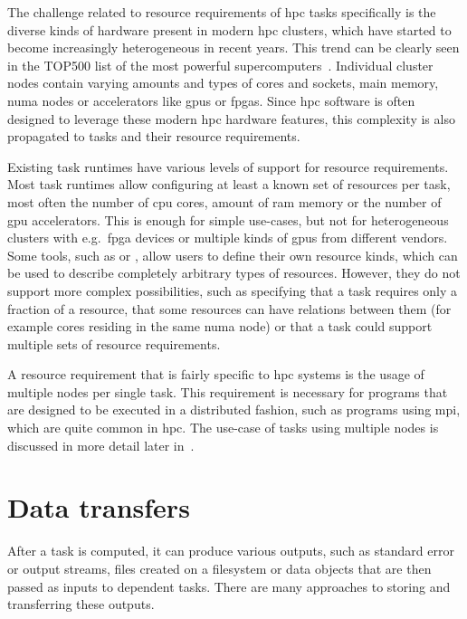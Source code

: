 The challenge related to resource requirements of \gls{hpc} tasks specifically is the
diverse kinds of hardware present in modern \gls{hpc} clusters, which have started to
become increasingly heterogeneous in recent years. This trend can be clearly seen in the TOP500
list of the most powerful supercomputers~\cite{top500analysis}. Individual cluster nodes contain
varying amounts and types of cores and sockets, main memory, \gls{numa} nodes or
accelerators like \glspl{gpu} or \glspl{fpga}. Since \gls{hpc}
software is often designed to leverage these modern \gls{hpc} hardware features, this
complexity is also propagated to tasks and their resource requirements.

Existing task runtimes have various levels of support for resource requirements. Most task runtimes
allow configuring at least a known set of resources per task, most often the number of
\gls{cpu} cores, amount of \gls{ram} memory or the number of
\gls{gpu} accelerators. This is enough for simple use-cases, but not for
heterogeneous clusters with e.g.\ \gls{fpga} devices or multiple kinds of
\glspl{gpu} from different vendors. Some tools, such as \dask{} or
\snakemake{}, allow users to define their own resource kinds, which can be used to
describe completely arbitrary types of resources. However, they do not support more complex
possibilities, such as specifying that a task requires only a fraction of a resource, that some
resources can have relations between them (for example cores residing in the same
\gls{numa} node) or that a task could support multiple sets of resource requirements.


A resource requirement that is fairly specific to \gls{hpc} systems is the usage of
multiple nodes per single task. This requirement is necessary for programs that are designed to be
executed in a distributed fashion, such as programs using \gls{mpi}, which are quite
common in \gls{hpc}. The use-case of tasks using multiple nodes is discussed in more
detail later in~.

\section{Data transfers}
After a task is computed, it can produce various outputs, such as standard error or output streams,
files created on a filesystem or data objects that are then passed as inputs to dependent tasks.
There are many approaches to storing and transferring these outputs.

